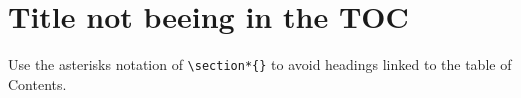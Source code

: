 \label{ch:Appendix}

\section*{Title not beeing in the TOC}

Use the asterisks notation of \verb|\section*{}| to avoid headings linked to the table of Contents.